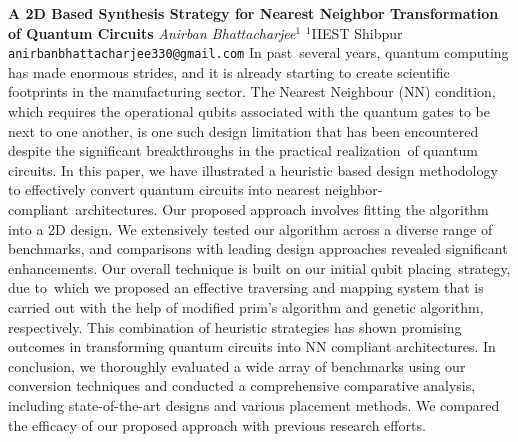 
    \begin{conf-abstract}[]
        {\textbf{A 2D Based Synthesis Strategy for Nearest Neighbor  Transformation of Quantum Circuits}}
        {\textit{Anirban Bhattacharjee$^{1}$}}
        {$^{1}$IIEST Shibpur}
        {\texttt{anirbanbhattacharjee330@gmail.com}}
        {In past several years, quantum computing has made enormous strides, and it is already starting to create scientific footprints in the manufacturing sector. The Nearest Neighbour (NN) condition, which requires the operational qubits associated with the quantum gates to be next to one another, is one such design limitation that has been encountered despite the significant breakthroughs in the practical realization of quantum circuits. In this paper, we have illustrated a heuristic based design methodology to effectively convert quantum circuits into nearest neighbor-compliant architectures. Our proposed approach involves fitting the algorithm into a 2D design. We extensively tested our algorithm across a diverse range of benchmarks, and comparisons with leading design approaches revealed significant enhancements. Our overall technique is built on our initial qubit placing strategy, due to which we proposed an effective traversing and mapping system that is carried out with the help of modified prim's algorithm and genetic algorithm, respectively. This combination of heuristic strategies has shown promising outcomes in transforming quantum circuits into NN compliant architectures. In conclusion, we thoroughly evaluated a wide array of benchmarks using our conversion techniques and conducted a comprehensive comparative analysis, including state-of-the-art designs and various placement methods. We compared the efficacy of our proposed approach with previous research efforts.}
    \end{conf-abstract}
        